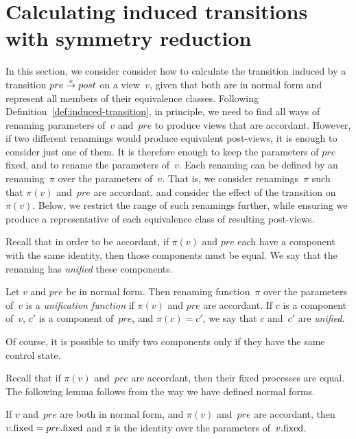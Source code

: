 \section{Calculating induced transitions with symmetry reduction}
\label{sec:induced-symmetry}

In this section, we consider consider how to calculate the transition induced
by a transition $pre \stackrel{e}\rightarrow post$ on a view~$v$, given that both are in
normal form and represent all members of their equivalence classes.  
%
Following Definition~\ref{def:induced-transition}, in principle, we need to
find all ways of renaming parameters of~$v$ and~$pre$ to produce views that
are accordant.  However, if two different renamings would produce equivalent
post-views, it is enough to consider just one of them.  It is therefore enough
to keep the parameters of $pre$ fixed, and to rename the parameters of~$v$.
Each renaming can be defined by an renaming~$\pi$ over the parameters of~$v$.
That is, we consider renamings~$\pi$ such that $\pi(v)$ and~$pre$ are
accordant, and consider the effect of the transition on~$\pi(v)$.
%
Below, we restrict the range of such renamings further, while ensuring we
produce a representative of each equivalence class of resulting post-views.





Recall that in order to be accordant, if $\pi(v)$ and $pre$ each have a
component with the same identity, then those components must be equal.  We say
that the renaming has \emph{unified} these components.
%
\begin{definition}
Let $v$ and $pre$ be in normal form.  Then renaming function~$\pi$ over the
parameters of~$v$ is a \emph{unification function} if $\pi(v)$ and $pre$ are
accordant.
%
If $c$ is a component of~$v$, $c'$ is a component of~$pre$, and $\pi(c) = c'$,
we say that $c$ and~$c'$ are \emph{unified}.
\end{definition}
%
Of course, it is possible to unify two components only if they have the same
control state. 

Recall that if $\pi(v)$ and~$pre$ are accordant, then their fixed processes
are equal.  The following lemma follows from the way we have defined normal
forms. 
%
\begin{lemma}
If $v$ and~$pre$ are both in normal form, and $\pi(v)$ and~$pre$ are
accordant, then $v.\mathrm{fixed} = pre.\mathrm{fixed}$ and $\pi$ is the identity over the
parameters of~$v.\mathrm{fixed}$.
\end{lemma}

